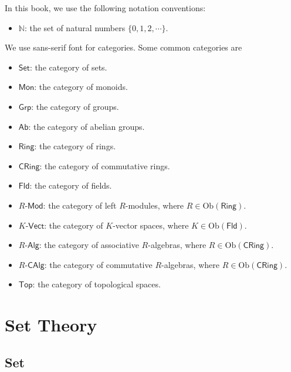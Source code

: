 \documentclass{report}
\begin{document}
In this book, we use the following notation conventions:
\begin{itemize}
    \item $\mathbb{N}$: the set of natural numbers $\{0,1,2,\cdots\}$.
\end{itemize}
We use sans-serif font for categories. Some common categories are
\begin{itemize}
    \item $\mathsf{Set}$: the category of sets.
    \item $\mathsf{Mon}$: the category of monoids.
    \item $\mathsf{Grp}$: the category of groups.
    \item $\mathsf{Ab}$: the category of abelian groups.
    \item $\mathsf{Ring}$: the category of rings.
    \item $\mathsf{CRing}$: the category of commutative rings.
    \item $\mathsf{Fld}$: the category of fields.
    \item $R\text{-}\mathsf{Mod}$: the category of left $R$-modules, where $R\in \mathrm{Ob}\left(\mathsf{Ring}\right)$.
    \item $K\text{-}\mathsf{Vect}$: the category of $K$-vector spaces, where $K\in \mathrm{Ob}\left(\mathsf{Fld}\right)$.
    \item $R\text{-}\mathsf{Alg}$: the category of associative $R$-algebras, where $R\in \mathrm{Ob}\left(\mathsf{CRing}\right)$.
    \item $R\text{-}\mathsf{CAlg}$: the category of commutative $R$-algebras, where $R\in \mathrm{Ob}\left(\mathsf{CRing}\right)$.
    \item $\mathsf{Top}$: the category of topological spaces.
\end{itemize}


\chapter{Set Theory}
\section{Set}
\end{document}

